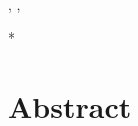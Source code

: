 \documentclass[10pt,a4paper]{article}
\begin{document}


\begin{flushleft}
{\Large
\textbf\newline{
\Title
} %
}
\newline
\\
\AuthorED, %
\AuthorPA, %
\AuthorLP%
\\
\bigskip
\Address
\bigskip

%
%





* \EmailLP

\end{flushleft}
\section*{Abstract}
\Abstract
\end{document}
